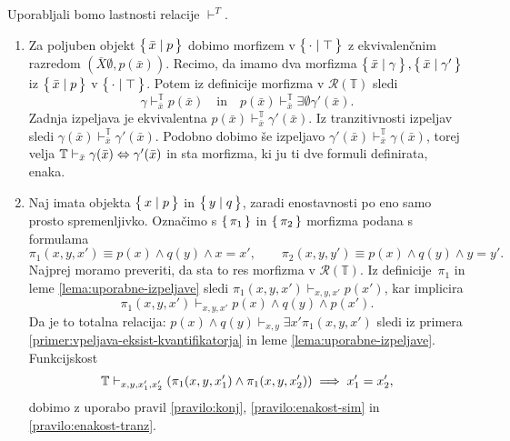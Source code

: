 \documentclass[../kategoricna_logika.tex]{subfiles}
\begin{document}
  \begin{dokaz}
    Uporabljali bomo lastnosti relacije $\vdash^T$.
    \begin{enumerate}[label=(\roman*)]
    \item Za poljuben objekt $\left\lbrace\,\bar{x} \mid p\,\right\rbrace$ dobimo morfizem v
      $\left\lbrace\,\cdot \mid \top\,\right\rbrace$ z ekvivalenčnim razredom
      $(\bar{X}\emptyset, p(\bar{x}))$.  Recimo, da imamo dva morfizma
      $\left\lbrace\,\bar{x} \mid \gamma\,\right\rbrace, \left\lbrace\,\bar{x} \mid \gamma'\,\right\rbrace$ iz
      $\left\lbrace\,\bar{x} \mid p\,\right\rbrace$ v $\left\lbrace\,\cdot \mid \top\,\right\rbrace$.  Potem iz
      definicije morfizma v $\mathcal{R}(\mathbb{T})$ sledi
      \[ \gamma \vdash_{\bar{x}}^{\mathbb{T}} p(\bar{x})\quad
        \text{in}\quad p(\bar{x}) \vdash_{\bar{x}}^{\mathbb{T}}
        \exists \emptyset \gamma'(\bar{x}).\] Zadnja izpeljava je
      ekvivalentna
      $p(\bar{x}) \vdash_{\bar{x}}^{\mathbb{T}} \gamma'(\bar{x})$.  Iz
      tranzitivnosti izpeljav sledi
      $\gamma(\bar{x}) \vdash_{\bar{x}}^{\mathbb{T}}
      \gamma'(\bar{x})$.  Podobno dobimo še izpeljavo
      $\gamma'(\bar{x}) \vdash_{\bar{x}}^{\mathbb{T}} \gamma(\bar{x})
      $, torej velja
      $\mathbb{T} \vdash_{\bar{x}} \gamma(\bar{x}) \Leftrightarrow
      \gamma'(\bar{x})$ in sta morfizma, ki ju ti dve formuli
      definirata, enaka.
    
    \item Naj imata objekta $\left\lbrace\,x \mid p\,\right\rbrace$ in $\left\lbrace\,y \mid q\,\right\rbrace$,
      zaradi enostavnosti po eno samo prosto spremenljivko.  Označimo
      s $\left\lbrace\,\pi_1\,\right\rbrace$ in $\left\lbrace\,\pi_2\,\right\rbrace$ morfizma podana s formulama
      \[ \pi_1(x,y,x') \equiv p(x) \land q(y) \land x=x', \qquad
        \pi_2(x,y,y') \equiv p(x) \land q(y) \land y=y'.
      \]
      Najprej moramo preveriti, da sta to res morfizma v
      $\mathcal{R}(\mathbb{T})$.  Iz definicije~$\pi_1$ in leme
      \ref{lema:uporabne-izpeljave} sledi
      $\pi_1(x,y,x') \vdash_{x,y,x'} p(x')$, kar implicira
    $$\pi_1(x,y,x') \vdash_{x,y,x'} p(x) \land q(y) \land p(x').$$
    Da je to totalna relacija:
    $p(x) \land q(y) \vdash_{x,y} \exists x' \pi_1(x,y,x')$ sledi iz
    primera \ref{primer:vpeljava-eksist-kvantifikatorja} in leme
    \ref{lema:uporabne-izpeljave}.  Funkcijskost
    \[\mathbb{T} \vdash_{x,y,x_1',x_2'} (\pi_1(x,y,x_1') \land
      \pi_1(x,y,x_2')) \implies x_1' = x_2',\] dobimo z uporabo pravil
    \ref{pravilo:konj}, \ref{pravilo:enakost-sim} in
    \ref{pravilo:enakost-tranz}.


\end{enumerate}
\end{dokaz}
\end{document}

